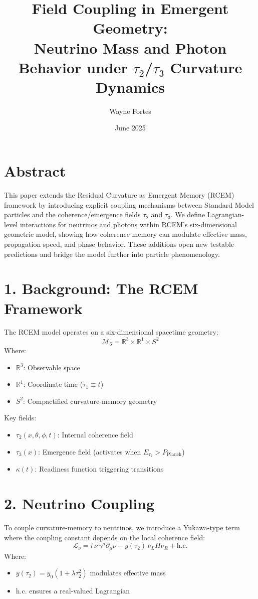 \documentclass[12pt]{article}
\title{Field Coupling in Emergent Geometry:\\ Neutrino Mass and Photon Behavior under $\tau_2$/$\tau_3$ Curvature Dynamics}
\author{Wayne Fortes}
\date{June 2025}
\begin{document}
\maketitle

\section*{Abstract}
This paper extends the Residual Curvature as Emergent Memory (RCEM) framework by introducing explicit coupling mechanisms between Standard Model particles and the coherence/emergence fields $\tau_2$ and $\tau_3$. We define Lagrangian-level interactions for neutrinos and photons within RCEM's six-dimensional geometric model, showing how coherence memory can modulate effective mass, propagation speed, and phase behavior. These additions open new testable predictions and bridge the model further into particle phenomenology.

 

\section*{1. Background: The RCEM Framework}
The RCEM model operates on a six-dimensional spacetime geometry:
\[
\mathcal{M}_6 = \mathbb{R}^3 \times \mathbb{R}^1 \times S^2
\]
Where:
\begin{itemize}
  \item $\mathbb{R}^3$: Observable space
  \item $\mathbb{R}^1$: Coordinate time ($\tau_1 \equiv t$)
  \item $S^2$: Compactified curvature-memory geometry
\end{itemize}

Key fields:
\begin{itemize}
  \item $\tau_2(x, \theta, \phi, t)$: Internal coherence field
  \item $\tau_3(x)$: Emergence field (activates when $E_{\tau_2} > P_{\text{Planck}}$)
  \item $\kappa(t)$: Readiness function triggering transitions
\end{itemize}

\section*{2. Neutrino Coupling}
To couple curvature-memory to neutrinos, we introduce a Yukawa-type term where the coupling constant depends on the local coherence field:
\[
\mathcal{L}_\nu = i \, \bar{\nu} \, \gamma^\mu \partial_\mu \nu - y(\tau_2) \, \bar{\nu}_L H \nu_R + \text{h.c.}
\]
Where:
\begin{itemize}
  \item $y(\tau_2) = y_0 (1 + \lambda \tau_2^2)$ modulates effective mass
  \item h.c. ensures a real-valued Lagrangian
\end{itemize}
\end{document}

